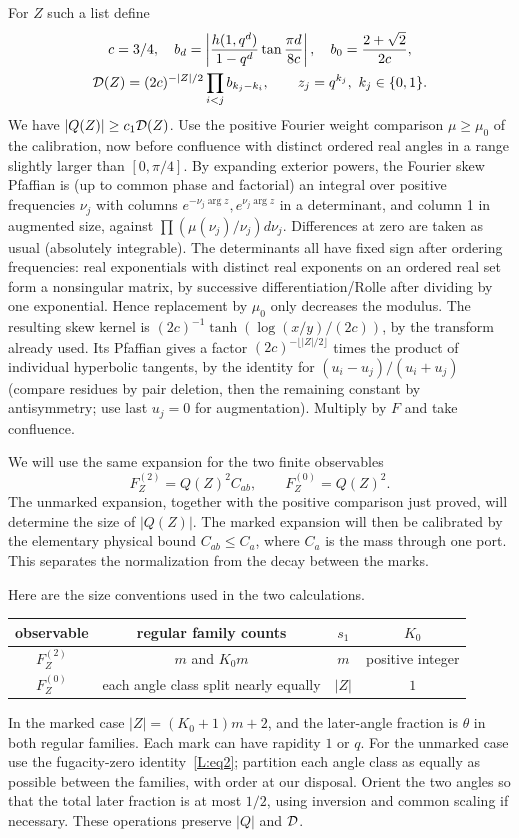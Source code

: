 For \(Z\) such a list define
\[
\begin{gathered}
 c=3/4,\quad b_d=\left|\frac{h(1,q^d)}{1-q^d}\tan\frac{\pi d}{8c}\right|,
 \quad b_0=\frac{2+\sqrt2}{2c},\\
 {\cal D}(Z)=(2c)^{-|Z|/2}\prod_{i<j} b_{k_j-k_i},\qquad z_j=q^{k_j},\ k_j\in\{0,1\}.
\end{gathered}
\]
We have \(|Q(Z)|\ge c_1{\cal D}(Z)\). Use the positive Fourier weight comparison \(\mu\ge\mu_0\) of the calibration, now before confluence with distinct ordered real angles in a range slightly larger than \([0,\pi/4]\). By expanding exterior powers, the Fourier skew Pfaffian is (up to common phase and factorial) an integral over positive frequencies \(\nu_j\) with columns \(e^{-\nu_j\arg z},e^{\nu_j\arg z}\) in a determinant, and column 1 in augmented size, against \(\prod(\mu(\nu_j)/\nu_j)d\nu_j\). Differences at zero are taken as usual (absolutely integrable). The determinants all have fixed sign after ordering frequencies: real exponentials with distinct real exponents on an ordered real set form a nonsingular matrix, by successive differentiation/Rolle after dividing by one exponential. Hence replacement by \(\mu_0\) only decreases the modulus. The resulting skew kernel is \((2c)^{-1}\tanh(\log(x/y)/(2c))\), by the transform already used. Its Pfaffian gives a factor \((2c)^{-\lfloor |Z|/2\rfloor}\) times the product of individual hyperbolic tangents, by the identity for \((u_i-u_j)/(u_i+u_j)\) (compare residues by pair deletion, then the remaining constant by antisymmetry; use last \(u_j=0\) for augmentation). Multiply by \(F\) and take confluence.

We will use the same expansion for the two finite observables
\[
 F_Z^{(2)}=Q(Z)^2C_{ab},\qquad F_Z^{(0)}=Q(Z)^2.
\]
The unmarked expansion, together with the positive comparison just proved,
will determine the size of $|Q(Z)|$. The marked expansion will then be
calibrated by the elementary physical bound $C_{ab}\le C_a$, where $C_a$
is the mass through one port. This separates the normalization from the
decay between the marks.

Here are the size conventions used in the two calculations.
\begin{center}
\begin{tabular}{c|c|c|c}
 observable & regular family counts & $s_1$ & $K_0$\\\hline
 $F_Z^{(2)}$ & $m$ and $K_0m$ & $m$ & positive integer\\
 $F_Z^{(0)}$ & each angle class split nearly equally & $|Z|$ & $1$
\end{tabular}
\end{center}
In the marked case $|Z|=(K_0+1)m+2$, and the later-angle fraction is
$\theta$ in both regular families. Each mark can have rapidity $1$ or $q$.
For the unmarked case use the fugacity-zero identity~\eqref{L:eq2};
partition each angle class as equally as possible between the families,
with order at our disposal. Orient the two angles so that the total later
fraction is at most $1/2$, using inversion and common scaling if necessary.
These operations preserve $|Q|$ and ${\cal D}$.

